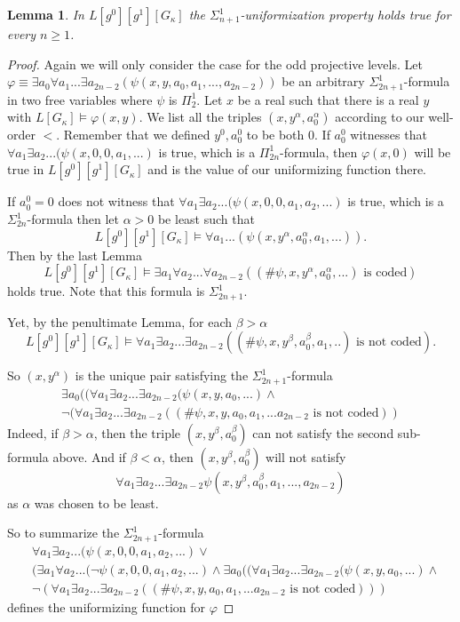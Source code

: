 \documentclass[a4paper,11pt]{article}
\newtheorem{lemma}[theorem]{Lemma}
\begin{document}
\begin{lemma}
In $L[g^0][g^1][G_{\kappa}]$ the $\Sigma^1_{n+1}$-uniformization property holds true for every $n \ge 1$.
\end{lemma}
\begin{proof}
Again we will only consider the case for the odd projective levels. Let $\varphi \equiv \exists a_0 \forall a_1 ...\exists a_{2n-2} (\psi (x,y,a_0,a_1,...,a_{2n-2}))$ be an arbitrary $\Sigma^1_{2n+1}$-formula in two free variables where $\psi$ is $\Pi^1_2$.
Let $x$ be a real such that there is a real $y $ with $L[G_{\kappa}] \models \varphi(x,y)$. We list all the triples $(x,y^{\alpha} ,a_0^{\alpha})$ according to our well-order $<$.
Remember that we defined $y^0, a_0^0$ to be both $0$. If $a_0^0$ witnesses that $\forall a_1 \exists a_2... (\psi (x,0,0,a_1,...)$ is true, which is a $\Pi^1_{2n}$-formula, then $\varphi (x,0)$ will be true in $L[g^0][g^1][G_{\kappa}]$ and is the value of our uniformizing function there.

If $a^0_0=0$ does not witness that $\forall a_1 \exists a_2...(\psi(x,0,0,a_1,a_2,...)$ is true, which is a $\Sigma^1_{2n}$-formula then 
let $\alpha> 0$ be least such that
\[ L[g^0][g^1][G_{\kappa}] \models \forall a_1... (\psi (x,y^{\alpha},a_0^{\alpha},a_1,...) ).\]
Then by the last Lemma
\[ L[g^0][g^1][G_{\kappa}] \models \exists a_1 \forall a_2... \forall a_{2n-2} ( (\# \psi,x,y^{\alpha},a^{\alpha}_0,...) \text{ is coded} ) \]
holds true. Note that this formula is $\Sigma^1_{2n+1}$.


Yet, by the penultimate Lemma, for each $\beta > \alpha$
\[ L[g^0][g^1][G_{\kappa}] \models\forall a_1 \exists a_2... \exists a_{2n-2} ((\#\psi,x,y^{\beta},a^{\beta}_0,a_1,..) \text{ is not coded}). \]

So $(x,y^{\alpha})$ is the unique pair satisfying the $\Sigma^1_{2n+1}$-formula
\begin{align*}
\exists a_0 ( (\forall a_1 \exists a_2...\exists a_{2n-2} ( \psi (x,y,a_0,...) \land \\
\lnot (\forall a_1 \exists a_2 ...\exists a_{2n-2} ((\#\psi,x,y,a_0,a_1,...a_{2n-2} \text{ is not coded} ) )
\end{align*}
Indeed, if $\beta > \alpha$, then the triple $(x,y^{\beta}, a_0^{\beta})$ can not satisfy the second sub-formula above. And if $\beta < \alpha$, then $(x,y^{\beta}, a_0^{\beta} )$ 
will not satisfy \[\forall a_1 \exists a_2...\exists a_{2n-2} \psi( x,y^{\beta}, a_0^{\beta}, a_1,...,a_{2n-2} )\] as $\alpha$ was chosen to be least.

So to summarize the $\Sigma^1_{2n+1}$-formula 
\begin{align*}
&\forall a_1 \exists a_2... (\psi (x,0,0,a_1,a_2,...) \lor \\&
(\exists a_1 \forall a_2...(\lnot \psi (x,0,0,a_1,a_2,...) \land
\exists a_0 ( (\forall a_1 \exists a_2...\exists a_{2n-2} ( \psi (x,y,a_0,...) \land \\&
\lnot (\forall a_1 \exists a_2 ...\exists a_{2n-2} ((\#\psi,x,y,a_0,a_1,...a_{2n-2} \text{ is not coded} ) ) )
\end{align*}
defines the uniformizing function for $\varphi$
\end{proof}
\end{document}
